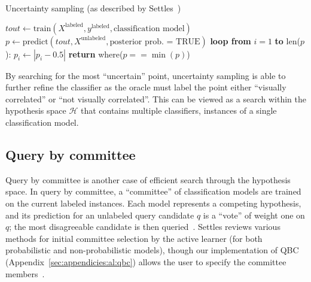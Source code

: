 \tablespacing
\begin{algorithm}[H]
	\caption{Uncertainty sampling (as described by 
	Settles~\cite{settles2010})}\label{alg:al:methods:uncertainty}
	\begin{algorithmic}[1]
		\State $\textit{tout} \gets 
		\text{train}(X^{\text{labeled}},y^{\text{labeled}},\text{classification 
		model})$
		\State $p \gets 
		\text{predict}(\textit{tout},X^{\text{unlabeled}},
		\text{posterior prob. = TRUE})$
		\State \textbf{loop from} $i=1$ \textbf{to} len($p$):
		\State \indent $p_i \gets |p_i-0.5|$
		\State \textbf{return} where($p==\min{(p)}$)
		\EndProcedure
	\end{algorithmic}
\end{algorithm}
\bodyspacing

\noindent By searching for the most ``uncertain'' point, uncertainty sampling 
is able to further refine the classifier as the oracle must label the point 
either ``visually correlated'' or ``not visually correlated''. This can be 
viewed as a search within the hypothesis space $\mathcal{H}$ that contains 
multiple classifiers, instances of a single classification model.








\subsection{Query by committee}
\label{sec:al:methods:qbc}

Query by committee is another case of efficient search through the hypothesis 
space. In query by committee, a ``committee'' of classification models are 
trained on the  current labeled instances.  Each model represents a competing 
hypothesis, and its prediction for an unlabeled query candidate $q$ is a 
``vote'' of weight one on $q$; the most disagreeable candidate is then 
queried~\cite{settles2010}. Settles reviews various methods for initial 
committee selection by the active learner (for both probabilistic and 
non-probabilistic models), though our implementation of QBC 
(Appendix~\ref{sec:appendicies:al:qbc}) allows the user to specify the 
committee members~\cite{settles2010}. 

